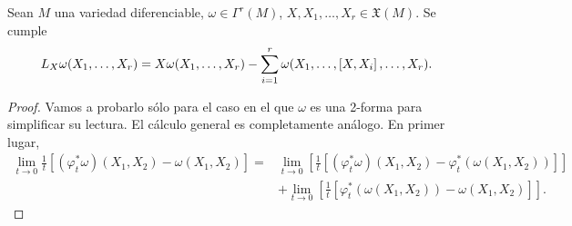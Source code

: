 \begin{prop}
  Sean $M$ una variedad diferenciable, $\omega \in \Gamma^r(M)$, $X,X_1,\dots,X_r\in \mathfrak{X} (M)$. Se cumple
  \begin{equation*}
    L_{X}\omega(X_1,\dots,X_r)=X\omega(X_1,\dots,X_r)-\sum_{i=1}^r \omega(X_1,\dots,\left[X,X_i\right],\dots,X_r).
  \end{equation*}
\end{prop}
\begin{proof}
  Vamos a probarlo sólo para el caso en el que $\omega$ es una 2-forma para simplificar su lectura. El cálculo general es completamente análogo.
  En primer lugar,
  \begin{align*}
    \lim_{t\rightarrow 0}\frac{1}{t}[(\varphi_t^* \omega)(X_1,X_2) - \omega (X_1,X_2)] =&\lim_{t\rightarrow 0}\left[\frac{1}{t}[(\varphi_t^* \omega)(X_1,X_2) - \varphi_t^*(\omega(X_1,X_2))]\right] \\
    &+ \lim_{t\rightarrow 0}\left[\frac{1}{t}[\varphi_t^*(\omega(X_1,X_2))-\omega(X_1,X_2)]\right].
  \end{align*}


\end{proof}
